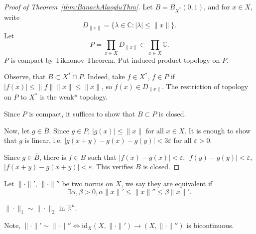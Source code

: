 
\begin{proof}[Proof of Theorem~\ref{thm:BanachAlaogluThm}]
	Let $B = B_{X^*}(0,1)$, and for $x \in X$, write
	\[
		D_{\|x\|} = \{\lambda \in \mathbb{C}: \left| \lambda \right|  \le  \|x\|\} 
	.\] 
	Let
	\[
		P = \prod_{x \in X} D_{\|x\|} \subset \prod_{x \in X} \mathbb{C}
	.\] 
	$P$ is compact by Tikhonov Theorem. Put induced product topology on $P$.


	Observe, that  $B \subset X^* \cap P$. Indeed, take $f \in X^*$, $f \in P$ if $\left| f(x) \right| \le \|f\| \|x\| \le \|x\|$, so $f(x) \in D_{\|x\|}$. The restriction of topology on $P$ to $X^*$ is the weak* topology.

	Since $P$ is compact, it suffices to show that $B \subset P$ is closed.

	Now, let $g \in \overline{B} $. Since $g \in P$, $\left| g(x) \right| \le \|x\|$ for all  $x \in X$. It is enough to show that $g$ is linear, i.e. $\left| g(x + y) - g(x) - g(y) \right| < 3 \varepsilon$ for all $\varepsilon > 0$. 

	Since $g \in \overline{B} $, there is $f \in B$ such that $\left| f(x) - g(x) \right|  < \varepsilon$, $\left| f(y) - g(y) \right| < \varepsilon$, $\left| f(x + y) - g(x + y) \right|  < \varepsilon$. This verifies $B$ is closed.
\end{proof}

\begin{definition}
	\label{defn:EquivalentNorms}
	Let $\|\cdot \|'$, $\|\cdot \|''$ be two norms on $X$, we say they are equivalent if
	\[
		\exists \alpha, \beta> 0, \alpha \|x\|' \le \|x\|'' \le \beta \|x\|'
	.\] 
\end{definition}
\begin{example}
	$\|\cdot \|_1 \sim \|\cdot \| _2$ in $\mathbb{R}^n$.
\end{example}
Note, $\|\cdot \|' \sim  \|\cdot \|'' \iff \text{id}_X (X, \|\cdot \|') \to (X, \|\cdot \|'')$ is bicontinuous.

